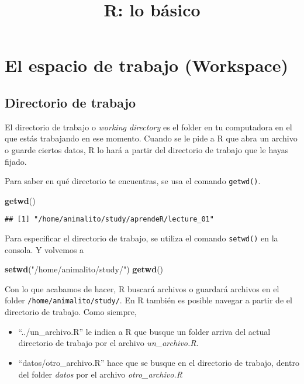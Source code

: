 \documentclass[]{article}
\title{R: lo básico}
\author{}
\date{}
\newenvironment{Shaded}{\begin{snugshade}}{\end{snugshade}}
\newcommand{\KeywordTok}[1]{\textcolor[rgb]{0.13,0.29,0.53}{\textbf{{#1}}}}
\newcommand{\StringTok}[1]{\textcolor[rgb]{0.31,0.60,0.02}{{#1}}}
\newcommand{\NormalTok}[1]{{#1}}
\begin{document}
\maketitle


\section{El espacio de trabajo
(Workspace)}\label{el-espacio-de-trabajo-workspace}

\subsection{Directorio de trabajo}\label{directorio-de-trabajo}

El directorio de trabajo o \emph{working directory} es el folder en tu
computadora en el que estás trabajando en ese momento. Cuando se le pide
a R que abra un archivo o guarde ciertos datos, R lo hará a partir del
directorio de trabajo que le hayas fijado.

Para saber en qué directorio te encuentras, se usa el comando
\texttt{getwd()}.

\begin{Shaded}
\begin{Highlighting}[]
\KeywordTok{getwd}\NormalTok{()}
\end{Highlighting}
\end{Shaded}

\begin{verbatim}
## [1] "/home/animalito/study/aprendeR/lecture_01"
\end{verbatim}

Para especificar el directorio de trabajo, se utiliza el comando
\texttt{setwd()} en la consola. Y volvemos a

\begin{Shaded}
\begin{Highlighting}[]
\KeywordTok{setwd}\NormalTok{(}\StringTok{"/home/animalito/study/"}\NormalTok{)}
\KeywordTok{getwd}\NormalTok{()}
\end{Highlighting}
\end{Shaded}

Con lo que acabamos de hacer, R buscará archivos o guardará archivos en
el folder \texttt{/home/animalito/study/}. En R también es posible
navegar a partir de el directorio de trabajo. Como siempre,

\begin{itemize}
\itemsep1pt\parskip0pt
\item
  ``../un\_archivo.R'' le indica a R que busque un folder arriva del
  actual directorio de trabajo por el archivo \emph{un\_archivo.R}.
\item
  ``datos/otro\_archivo.R'' hace que se busque en el directorio de
  trabajo, dentro del folder \emph{datos} por el archivo
  \emph{otro\_archivo.R}
\end{itemize}
\end{document}

